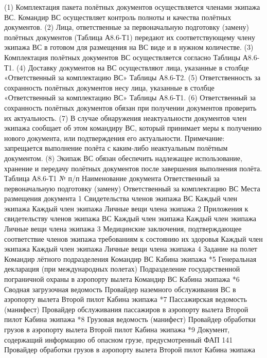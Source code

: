 (1)	Комплектация пакета полётных документов осуществляется членами экипажа ВС. Командир ВС осуществляет контроль полноты и качества полётных документов. 
(2)	Лица, ответственные за первоначальную подготовку (замену) полётных документов (Таблица А8.6-Т1) передают их соответствующему члену экипажа ВС в готовом для размещения на ВС виде и в нужном количестве. 
(3)	Комплектация полётных документов ВС осуществляется согласно Таблицы А8.6-Т1. 
(4)	Доставку документов на ВС осуществляют лица, указанные в столбце «Ответственный за комплектацию ВС» Таблицы А8.6-Т2.
(5)	Ответственность за сохранность полётных документов несу лица, указанные в столбце «Ответственный за комплектацию ВС» Таблицы А8.6-Т1.
(6)	Ответственный за сохранность полётных документов обязан при получении документов проверить их актуальность.
(7)	В случае обнаружения неактуальности документов член экипажа сообщает об этом командиру ВС, который принимает меры к получению нового документа, или подтверждения его актуальности. 
Примечание: запрещается выполнение полёта с каким-либо неактуальным полётным документом.
(8)	Экипаж ВС обязан обеспечить надлежащее использование, хранение и передачу полётных документов после завершения выполнения полёта. 
                                                                                                                                                 Таблица А8.6-Т1
№
п/п	Наименование документа	Ответственный за первоначальную подготовку (замену)	Ответственный за комплектацию ВС	Места размещения документа
1	Свидетельства членов экипажа ВС	Каждый член экипажа	Каждый член экипажа	Личные вещи члена экипажа
2	Приложения к свидетельству членов экипажа ВС	Каждый член экипажа	Каждый член экипажа	Личные вещи члена экипажа
3	Медицинские заключения, подтверждающее соответствие членов экипажа требованиям к состоянию их здоровья	Каждый член экипажа	Каждый член экипажа	Личные вещи члена экипажа
4	Задание на полет	Командир лётного подразделения	Командир ВС	Кабина экипажа
*5	Генеральная декларация (при международных полетах)	Подразделение государственной пограничной охраны в аэропорту вылета	Командир ВС	Кабина экипажа
*6	Сводная загрузочная ведомость	Провайдер наземного обслуживания ВС в аэропорту вылета	Второй пилот	Кабина экипажа
*7	Пассажирская ведомость (манифест)	Провайдер обслуживания пассажиров в аэропорту вылета	Второй пилот	Кабина экипажа
*8	Грузовая ведомость (манифест)	Провайдер обработки грузов в аэропорту вылета	Второй пилот	Кабина экипажа
*9	Документ, содержащий информацию об опасном грузе, предусмотренный ФАП 141	Провайдер обработки грузов в аэропорту вылета	Второй пилот	Кабина экипажа
